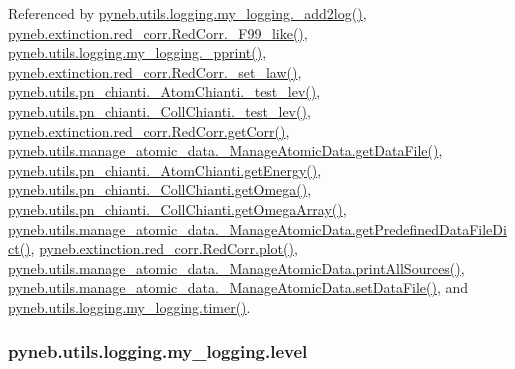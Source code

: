 Referenced by \hyperlink{logging_8py_source_l00059}{pyneb.\-utils.\-logging.\-my\-\_\-logging.\-\_\-add2log()}, \hyperlink{red__corr_8py_source_l00658}{pyneb.\-extinction.\-red\-\_\-corr.\-Red\-Corr.\-\_\-\-F99\-\_\-like()}, \hyperlink{logging_8py_source_l00051}{pyneb.\-utils.\-logging.\-my\-\_\-logging.\-\_\-pprint()}, \hyperlink{red__corr_8py_source_l00176}{pyneb.\-extinction.\-red\-\_\-corr.\-Red\-Corr.\-\_\-set\-\_\-law()}, \hyperlink{pn__chianti_8py_source_l00304}{pyneb.\-utils.\-pn\-\_\-chianti.\-\_\-\-Atom\-Chianti.\-\_\-test\-\_\-lev()}, \hyperlink{pn__chianti_8py_source_l00472}{pyneb.\-utils.\-pn\-\_\-chianti.\-\_\-\-Coll\-Chianti.\-\_\-test\-\_\-lev()}, \hyperlink{red__corr_8py_source_l00211}{pyneb.\-extinction.\-red\-\_\-corr.\-Red\-Corr.\-get\-Corr()}, \hyperlink{manage__atomic__data_8py_source_l00297}{pyneb.\-utils.\-manage\-\_\-atomic\-\_\-data.\-\_\-\-Manage\-Atomic\-Data.\-get\-Data\-File()}, \hyperlink{pn__chianti_8py_source_l00366}{pyneb.\-utils.\-pn\-\_\-chianti.\-\_\-\-Atom\-Chianti.\-get\-Energy()}, \hyperlink{pn__chianti_8py_source_l00507}{pyneb.\-utils.\-pn\-\_\-chianti.\-\_\-\-Coll\-Chianti.\-get\-Omega()}, \hyperlink{pn__chianti_8py_source_l00484}{pyneb.\-utils.\-pn\-\_\-chianti.\-\_\-\-Coll\-Chianti.\-get\-Omega\-Array()}, \hyperlink{manage__atomic__data_8py_source_l00034}{pyneb.\-utils.\-manage\-\_\-atomic\-\_\-data.\-\_\-\-Manage\-Atomic\-Data.\-get\-Predefined\-Data\-File\-Dict()}, \hyperlink{red__corr_8py_source_l00303}{pyneb.\-extinction.\-red\-\_\-corr.\-Red\-Corr.\-plot()}, \hyperlink{manage__atomic__data_8py_source_l00431}{pyneb.\-utils.\-manage\-\_\-atomic\-\_\-data.\-\_\-\-Manage\-Atomic\-Data.\-print\-All\-Sources()}, \hyperlink{manage__atomic__data_8py_source_l00380}{pyneb.\-utils.\-manage\-\_\-atomic\-\_\-data.\-\_\-\-Manage\-Atomic\-Data.\-set\-Data\-File()}, and \hyperlink{logging_8py_source_l00115}{pyneb.\-utils.\-logging.\-my\-\_\-logging.\-timer()}.

\hypertarget{classpyneb_1_1utils_1_1logging_1_1my__logging_aa70215328c3f7a97a607c584026e144a}{
\subsubsection[{level}]{\setlength{\rightskip}{0pt plus 5cm}pyneb.\-utils.\-logging.\-my\-\_\-logging.\-level}}\label{classpyneb_1_1utils_1_1logging_1_1my__logging_aa70215328c3f7a97a607c584026e144a}


